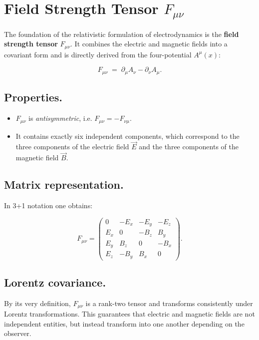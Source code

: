 \section{Field Strength Tensor \(F_{\mu\nu}\)}
\label{anhangA:feldstaerketensor}

The foundation of the relativistic formulation of electrodynamics
is the \textbf{field strength tensor} \( F_{\mu\nu} \).
It combines the electric and magnetic fields into a 
covariant form and is directly derived from the four-potential 
\( A^\mu(x) \):

\[
F_{\mu\nu} \;=\; \partial_\mu A_\nu - \partial_\nu A_\mu .
\]

\subsection*{Properties.}
\begin{itemize}
	\item \( F_{\mu\nu} \) is \emph{antisymmetric}, i.e. 
	\( F_{\mu\nu} = - F_{\nu\mu} \).  
	\item It contains exactly six independent components, 
	which correspond to the three components of the electric field \( \vec{E} \) 
	and the three components of the magnetic field \( \vec{B} \).
\end{itemize}

\subsection*{Matrix representation.}
In 3+1 notation one obtains:

\[
F_{\mu\nu} = 
\begin{pmatrix}
	0      & -E_x & -E_y & -E_z \\
	E_x    & 0    & -B_z & B_y \\
	E_y    & B_z  & 0    & -B_x \\
	E_z    & -B_y & B_x  & 0
\end{pmatrix}.
\]

\subsection*{Lorentz covariance.}
By its very definition, \( F_{\mu\nu} \) is a rank-two tensor
and transforms consistently under Lorentz transformations.
This guarantees that electric and magnetic fields
are not independent entities, but instead transform into one another 
depending on the observer.
